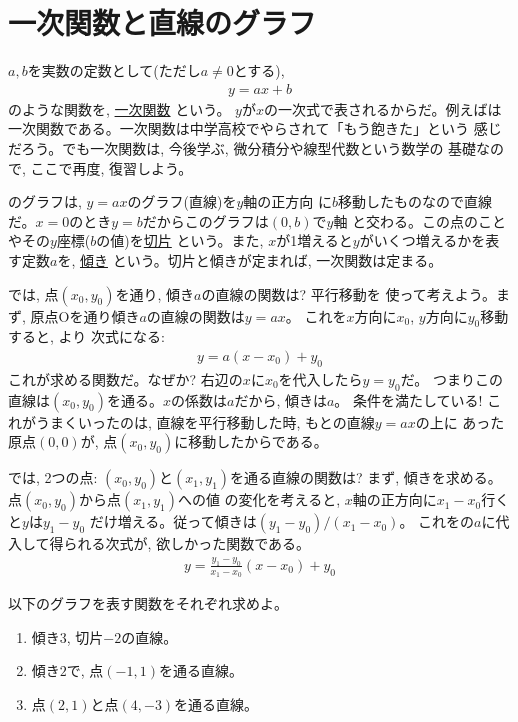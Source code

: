 \section{一次関数と直線のグラフ}

$a, b$を実数の定数として(ただし$a\ne0$とする), 
\begin{eqnarray}
y=ax+b\label{eq:y_ax_plus_b0}
\end{eqnarray}
のような関数を, \underline{一次関数} という。
$y$が$x$の一次式で表されるからだ。例えばは
一次関数である。一次関数は中学高校でやらされて「もう飽きた」という
感じだろう。でも一次関数は, 今後学ぶ, 微分積分や線型代数という数学の
基礎なので, ここで再度, 復習しよう。

のグラフは, $y=ax$のグラフ(直線)を$y$軸の正方向
に$b$移動したものなので直線だ。$x=0$のとき$y=b$だからこのグラフは$(0, b)$で$y$軸
と交わる。この点のことやその$y$座標($b$の値)を\underline{切片}
という。また, $x$が1増えると$y$がいくつ増えるかを表す定数$a$を, \underline{傾き}
という。切片と傾きが定まれば, 一次関数は定まる。

では, 点$(x_0, y_0)$を通り, 傾き$a$の直線の関数は? 平行移動を
使って考えよう。まず, 原点Oを通り傾き$a$の直線の関数は$y=ax$。
これを$x$方向に$x_0$, $y$方向に$y_0$移動すると, より
次式になる:
\begin{eqnarray}
y=a(x-x_0)+y_0\label{eq:lineeq}
\end{eqnarray}
これが求める関数だ。なぜか? 右辺の$x$に$x_0$を代入したら$y=y_0$だ。
つまりこの直線は$(x_0, y_0)$を通る。$x$の係数は$a$だから, 傾きは$a$。
条件を満たしている! これがうまくいったのは, 直線を平行移動した時, もとの直線$y=ax$の上に
あった原点$(0, 0)$が, 点$(x_0, y_0)$に移動したからである。

では, 2つの点: $(x_0, y_0)$と$(x_1, y_1)$を通る直線の関数は? 
まず, 傾きを求める。点$(x_0, y_0)$から点$(x_1, y_1)$への値
の変化を考えると, $x$軸の正方向に$x_1-x_0$行くと$y$は$y_1-y_0$
だけ増える。従って傾きは$(y_1-y_0)/(x_1-x_0)$。
これをの$a$に代入して得られる次式が, 欲しかった関数である。
\begin{eqnarray}
y=\frac{y_1-y_0}{x_1-x_0}(x-x_0)+y_0\label{eq:lineeq2p}
\end{eqnarray}


\begin{q}\label{q:func_line0} 以下のグラフを表す関数をそれぞれ求めよ。
\begin{enumerate}
\item 傾き$3$, 切片$-2$の直線。
\item 傾き$2$で, 点$(-1,1)$を通る直線。
\item 点$(2,1)$と点$(4,-3)$を通る直線。
\end{enumerate}\end{q}\mv

